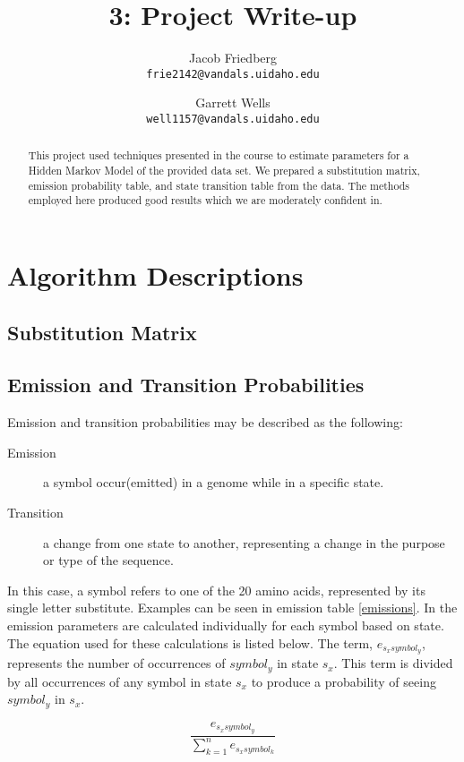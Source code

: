 \documentclass{article}
\title{3: Project Write-up}
\author{
Jacob Friedberg \\
\texttt{frie2142@vandals.uidaho.edu}
\and
Garrett Wells \\
\texttt{well1157@vandals.uidaho.edu}
}
\begin{document}
\maketitle
\begin{abstract}
    This project used techniques presented in the course to estimate parameters for a Hidden Markov Model of the provided data set. We prepared a substitution matrix, emission probability table, and state transition table from the data. The methods employed here produced good results which we are moderately confident in.
\end{abstract}

\section{Algorithm Descriptions}

\subsection{Substitution Matrix}

\subsection{Emission and Transition Probabilities}
Emission and transition probabilities may be described as the following:

\begin{description}
    \item[Emission] a symbol occur(emitted) in a genome while in a specific state.
    \item[Transition] a change from one state to another, representing a change in the purpose or type of the sequence.
\end{description}

In this case, a symbol refers to one of the 20 amino acids, represented by its single letter substitute. Examples can be seen in emission table \ref{emissions}. In the emission parameters are calculated individually for each symbol based on state. The equation used for these calculations is listed below. The term, $e_{s_{x}symbol_y}$, represents the number of occurrences of $symbol_y$ in state $s_x$. This term is divided by all occurrences of any symbol in state $s_x$ to produce a probability of seeing $symbol_y$ in $s_x$.

\begin{equation}
    \frac{e_{s_{x}symbol_y}}{\sum_{k=1}^n e_{s_xsymbol_k}}
\end{equation}
\end{document}

